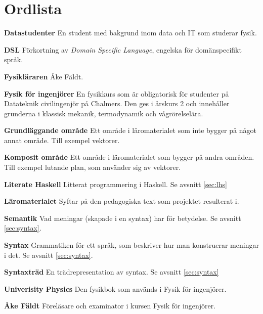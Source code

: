 
\chapter*{Ordlista}

\textbf{Datastudenter} En student med bakgrund inom data och IT som studerar fysik.

\textbf{DSL} Förkortning av \textit{Domain Specific Language}, engelska för domänspecifikt språk.

\textbf{Fysikläraren} Åke Fäldt.

\textbf{Fysik för ingenjörer} En fysikkurs som är obligatorisk för studenter på Datateknik civilingenjör på Chalmers. Den ges i årskurs 2 och innehåller grunderna i klassisk mekanik, termodynamik och vågrörelselära.

\textbf{Grundläggande område} Ett område i läromaterialet som inte bygger på något annat område. Till exempel vektorer.

\textbf{Komposit område} Ett område i läromaterialet som bygger på andra områden. Till exempel lutande plan, som använder sig av vektorer.

\textbf{Literate Haskell} Litterat programmering i Haskell. Se avsnitt \ref{sec:lhs}

\textbf{Läromaterialet} Syftar på den pedagogiska text som projektet resulterat i.

\textbf{Semantik} Vad meningar (skapade i en syntax) har för betydelse. Se avsnitt \ref{sec:syntax}.

\textbf{Syntax} Grammatiken för ett språk, som beskriver hur man konstruerar meningar i det. Se avsnitt \ref{sec:syntax}.

\textbf{Syntaxträd} En trädrepresentation av syntax. Se avsnitt \ref{sec:syntax}

\textbf{Univerisity Physics} Den fysikbok som används i Fysik för ingenjörer.

\textbf{Åke Fäldt} Föreläsare och examinator i kursen Fysik för ingenjörer.
